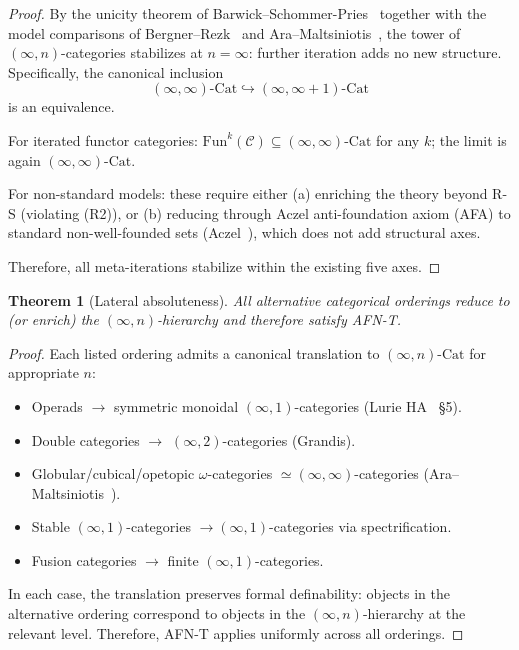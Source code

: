 \documentclass[11pt]{article}
\theoremstyle{plain}
\newtheorem{theorem}{Theorem}[section]
\theoremstyle{definition}
\newcommand{\cC}{\mathcal{C}}
\newcommand{\Fun}{\mathrm{Fun}}
\newcommand{\Cat}{\mathrm{Cat}}
\begin{document}
\begin{proof}
By the unicity theorem of Barwick--Schommer-Pries~\cite{BarwickSchommerPries2021} together with the model comparisons of Bergner--Rezk~\cite{BergnerRezk2013} and Ara--Maltsiniotis~\cite{AraMaltsiniotis2017}, the tower of $(\infty, n)$-categories stabilizes at $n = \infty$: further iteration adds no new structure. Specifically, the canonical inclusion
\[ (\infty, \infty)\text{-}\Cat \hookrightarrow (\infty, \infty + 1)\text{-}\Cat \]
is an equivalence.

For iterated functor categories: $\Fun^k(\cC) \subseteq (\infty, \infty)\text{-}\Cat$ for any $k$; the limit is again $(\infty, \infty)$-$\Cat$.

For non-standard models: these require either (a) enriching the theory beyond R-S (violating (R2)), or (b) reducing through Aczel anti-foundation axiom (AFA) to standard non-well-founded sets (Aczel~\cite{Aczel1988}), which does not add structural axes.

Therefore, all meta-iterations stabilize within the existing five axes.
\end{proof}

\begin{theorem}[Lateral absoluteness]\label{thm:lateral}
All alternative categorical orderings reduce to (or enrich) the $(\infty, n)$-hierarchy and therefore satisfy AFN-T.
\end{theorem}

\begin{proof}
Each listed ordering admits a canonical translation to $(\infty, n)$-$\Cat$ for appropriate $n$:
\begin{itemize}
\item Operads $\to$ symmetric monoidal $(\infty, 1)$-categories (Lurie HA~\cite{LurieHA} \S 5).
\item Double categories $\to$ $(\infty, 2)$-categories (Grandis).
\item Globular/cubical/opetopic $\omega$-categories $\simeq (\infty, \infty)$-categories (Ara--Maltsiniotis~\cite{AraMaltsiniotis2017}).
\item Stable $(\infty, 1)$-categories $\to (\infty, 1)$-categories via spectrification.
\item Fusion categories $\to$ finite $(\infty, 1)$-categories.
\end{itemize}
In each case, the translation preserves formal definability: objects in the alternative ordering correspond to objects in the $(\infty, n)$-hierarchy at the relevant level. Therefore, AFN-T applies uniformly across all orderings.
\end{proof}
\end{document}
